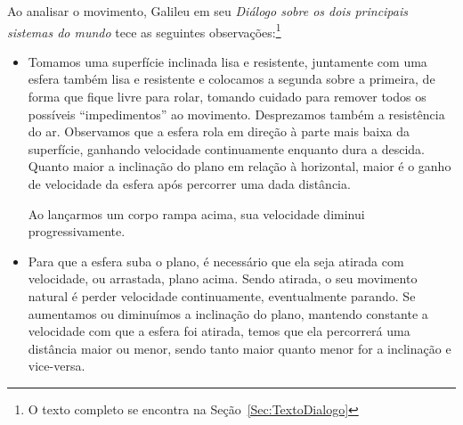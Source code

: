 Ao analisar o movimento, Galileu em seu \emph{Diálogo sobre os dois principais sistemas do mundo} tece as seguintes observações:\footnote{O texto completo se encontra na Seção~\ref{Sec:TextoDialogo}}
\begin{itemize}

\begin{marginfigure}
\centering
{}
\caption{Um corpo que pode se mover livremente em uma rampa se desloca em direção ao ponto mais baixo e ganha velocidade durante o movimento.}
\end{marginfigure}
  \item Tomamos uma superfície inclinada lisa e resistente, juntamente com uma esfera também lisa e resistente e colocamos a segunda sobre a primeira, de forma que fique livre para rolar, tomando cuidado para remover todos os possíveis ``impedimentos'' ao movimento. Desprezamos também a resistência do ar. Observamos que a esfera rola em direção à parte mais baixa da superfície, ganhando velocidade continuamente enquanto dura a descida. Quanto maior a inclinação do plano em relação à horizontal, maior é o ganho de velocidade da esfera após percorrer uma dada distância.
  
\begin{marginfigure}[5mm]
\centering
{}
\caption{Ao lançarmos um corpo rampa acima, sua velocidade diminui progressivamente.}
\end{marginfigure}
  \item Para que a esfera suba o plano, é necessário que ela seja atirada com velocidade, ou arrastada, plano acima. Sendo atirada, o seu movimento natural é perder velocidade continuamente, eventualmente parando. Se aumentamos ou diminuímos a inclinação do plano, mantendo constante a velocidade com que a esfera foi atirada, temos que ela percorrerá uma distância maior ou menor, sendo tanto maior quanto menor for a inclinação e vice-versa.


\end{itemize}
